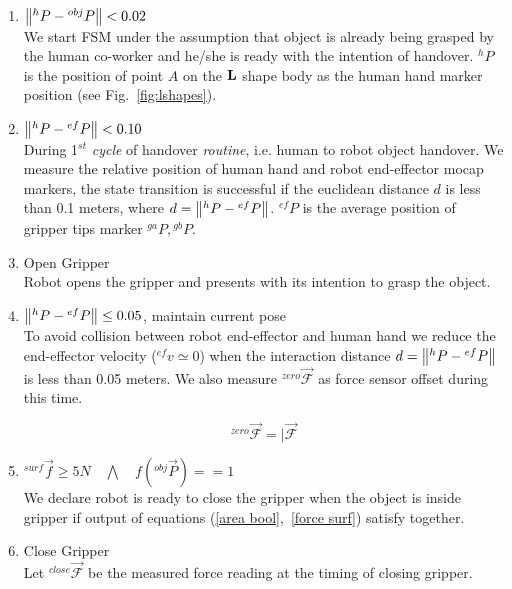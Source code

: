 \begin{enumerate}[start=0,label={\bf{t}\arabic*:}]

    \item $\norm{{}^h{P} - {}^{obj}{P}} < 0.02$\\
    We start FSM under the assumption that object is already being grasped by the human co-worker and he/she is ready with the intention of handover. ${}^h{P}$ is the position of point $A$ on the ${\bf L}$ shape body as the human hand marker position (see Fig.~\ref{fig:lshapes}).
    
    
    \item $\norm{{}^h{P} - {}^{ef}{P}} < 0.10$\\
	During 1$^{st}$ \textit{cycle} of handover \textit{routine}, i.e. human to robot object handover. We measure the relative position of human hand and robot end-effector mocap markers, the state transition is successful if the euclidean distance $d$ is less than 0.1 meters, where $d = \norm{{}^h{P} - {}^{ef}{P}}$. ${}^{ef}{P}$ is the average position of gripper tips marker ${}^{ga}P, {}^{gb}P$. 
    
    \item Open Gripper\\
    Robot opens the gripper and presents with its intention to grasp the object.
    
    \item $\norm{{}^h{P} - {}^{ef}{P}} \leq 0.05$, maintain current pose\\
    To avoid collision between robot end-effector and human hand we reduce the end-effector velocity (${}^{ef}v\simeq0$) when the interaction distance $d = \norm{{}^h{P} - {}^{ef}{P}}$ is less than 0.05 meters. We also measure ${}^{zero}\vec{\mathcal{F}}$ as force sensor offset during this time.

    \begin{equation}\label{Fzero}
        {}^{zero}\vec{\mathcal{F}} = \vert{\vec{\mathcal{F}}}
    \end{equation}

    \item ${}^{surf}\vec{f} \geq 5N \quad \bigwedge \quad f({}^{obj}\vec{P})  == 1$\\
    We declare robot is ready to close the gripper when the object is inside gripper if output of equations (\ref{area bool},~\ref{force surf}) satisfy together.
    
    \item Close Gripper\\
    Let ${}^{close}\vec{\mathcal{F}}$ be the measured force reading at the timing of closing gripper.
        

\end{enumerate}

